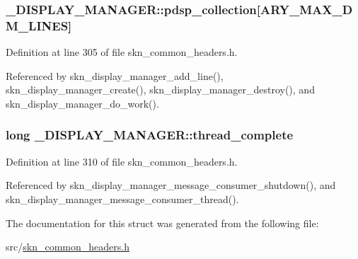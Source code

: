 \hypertarget{struct___d_i_s_p_l_a_y___m_a_n_a_g_e_r_a3a5ccb906320bd6aecbf89cb6b0fc234}{
\subsubsection[{pdsp\+\_\+collection}]{ \+\_\+\+D\+I\+S\+P\+L\+A\+Y\+\_\+\+M\+A\+N\+A\+G\+E\+R\+::pdsp\+\_\+collection\mbox{[}{\bf A\+R\+Y\+\_\+\+M\+A\+X\+\_\+\+D\+M\+\_\+\+L\+I\+N\+E\+S}\mbox{]}}}\label{struct___d_i_s_p_l_a_y___m_a_n_a_g_e_r_a3a5ccb906320bd6aecbf89cb6b0fc234}


Definition at line 305 of file skn\+\_\+common\+\_\+headers.\+h.



Referenced by skn\+\_\+display\+\_\+manager\+\_\+add\+\_\+line(), skn\+\_\+display\+\_\+manager\+\_\+create(), skn\+\_\+display\+\_\+manager\+\_\+destroy(), and skn\+\_\+display\+\_\+manager\+\_\+do\+\_\+work().

\hypertarget{struct___d_i_s_p_l_a_y___m_a_n_a_g_e_r_ae20e9cf0e6789ce07c5b8005b4a7ada0}{
\subsubsection[{thread\+\_\+complete}]{\setlength{\rightskip}{0pt plus 5cm}long \+\_\+\+D\+I\+S\+P\+L\+A\+Y\+\_\+\+M\+A\+N\+A\+G\+E\+R\+::thread\+\_\+complete}}\label{struct___d_i_s_p_l_a_y___m_a_n_a_g_e_r_ae20e9cf0e6789ce07c5b8005b4a7ada0}


Definition at line 310 of file skn\+\_\+common\+\_\+headers.\+h.



Referenced by skn\+\_\+display\+\_\+manager\+\_\+message\+\_\+consumer\+\_\+shutdown(), and skn\+\_\+display\+\_\+manager\+\_\+message\+\_\+consumer\+\_\+thread().



The documentation for this struct was generated from the following file\+:\begin{DoxyCompactItemize}
\item 
src/\hyperlink{skn__common__headers_8h}{skn\+\_\+common\+\_\+headers.\+h}\end{DoxyCompactItemize}
